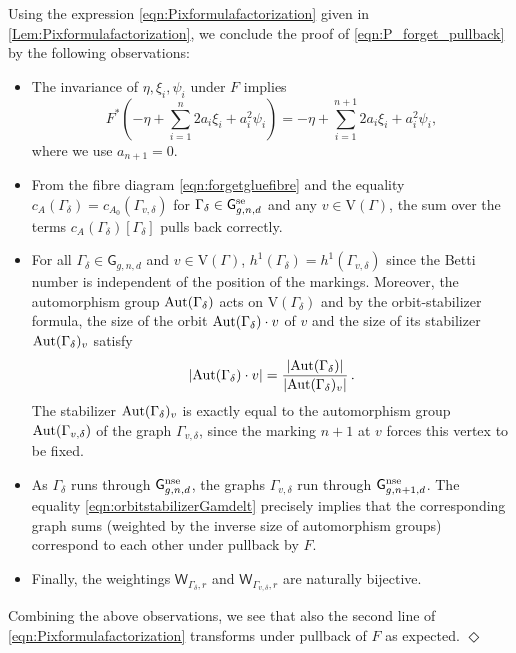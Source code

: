\documentclass[a4paper,12pt]{article} %
\def\qed{{\hfill $\Diamond$}}
\def\Aut{{\rm Aut}}
\def\V{\mathrm{V}}
\def\G{\mathsf{G}}
\theoremstyle{definition}
\theoremstyle{plain}%
\begin{document}
Using the expression \eqref{eqn:Pixformulafactorization} given in \cref{Lem:Pixformulafactorization}, we conclude the proof of \eqref{eqn:P_forget_pullback} by the following observations:
\begin{itemize}
    \item The invariance of $\eta, \xi_i, \psi_i$ under $F$ implies
    \[F^*(-\eta + \sum_{i=1}^n 2 a_i \xi_i+ a_i^2 \psi_i ) = -\eta + \sum_{i=1}^{n+1} 2 a_i \xi_i+ a_i^2 \psi_i, \]
    where we use $a_{n+1}=0$.
    \item From the fibre diagram \eqref{eqn:forgetgluefibre} and the equality $c_{A}(\Gamma_\delta) = c_{A_0}(\Gamma_{v,\delta})$ for $\Gamma_\delta \in \G_{g,n,d}^\textup{se}$ and any $v \in \V(\Gamma)$, the sum over the terms $c_A(\Gamma_\delta) [\Gamma_\delta]$ pulls back correctly.
    \item For all $\Gamma_\delta \in \G_{g,n,d}$ and $v \in \V(\Gamma)$, $h^1(\Gamma_\delta) = h^1(\Gamma_{v,\delta})$ since the Betti number is independent of the position of the markings. Moreover, the automorphism group $\Aut(\Gamma_\delta)$ acts on $\V(\Gamma_\delta)$ and by the orbit-stabilizer formula, the size of the orbit  $\Aut(\Gamma_\delta) \cdot v$ of $v$ and the size of its stabilizer $\Aut(\Gamma_\delta)_v$ satisfy
    \begin{equation} \label{eqn:orbitstabilizerGamdelt}|\Aut(\Gamma_\delta) \cdot v| = \frac{|\Aut(\Gamma_\delta)|}{|\Aut(\Gamma_\delta)_v|}\, .\end{equation}
    The stabilizer $\Aut(\Gamma_\delta)_v$ is exactly equal to the automorphism group $\Aut(\Gamma_{v,\delta})$ of the graph $\Gamma_{v,\delta}$, since the marking $n+1$ at $v$ forces this vertex to be fixed. 
    \item As $\Gamma_\delta$ runs through $\G_{g,n,d}^\textup{nse}$, the graphs $\Gamma_{v,\delta}$ run through $\G_{g,n+1,d}^\textup{nse}$. The equality \eqref{eqn:orbitstabilizerGamdelt} precisely implies that the corresponding graph sums (weighted by the inverse size of automorphism groups) correspond to each other under pullback by $F$.
    \item Finally, the weightings $\mathsf{W}_{\Gamma_\delta,r}$ and $\mathsf{W}_{\Gamma_{v,\delta},r}$ are naturally bijective.
\end{itemize}
Combining the above observations, we see that also the second line of \eqref{eqn:Pixformulafactorization} transforms under pullback of $F$ as expected. \qed
\end{document}
